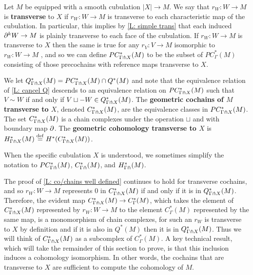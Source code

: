\begin{definition}
	Let $M$ be equipped with a smooth cubulation $|X| \to M$.
	We say that $r_W \colon W \to M$ is \textbf{transverse} to $X$ if $r_W \colon W \to M$ is transverse to each characteristic map of the cubulation.
	In particular, this implies by \cref{L: simple trans} that each induced $\partial^kW \to M$ is plainly transverse to each face of the cubulation.
	If $r_W \colon W \to M$ is transverse to $X$ then the same is true for any $r_V \colon V \to M$ isomorphic to $r_W \colon W \to M$ , and so we can define $PC^*_{\Gamma \pitchfork X}(M)$ to be the subset of $PC^*_{\Gamma}(M)$ consisting of those precochains with reference maps transverse to $X$.

	We let $Q^*_{\Gamma \pitchfork X}(M) = PC_{\Gamma \pitchfork X}^*(M) \cap Q^*(M)$ and note that the equivalence relation of \cref{L: cancel Q} descends to an equivalence relation on $PC_{\Gamma \pitchfork X}^*(M)$ such that $V\sim W$ if and only if $V \sqcup -W \in Q^*_{\Gamma \pitchfork X}(M)$.
	The \textbf{geometric cochains of $M$ transverse to $X$}, denoted $C_{\Gamma \pitchfork X}^*(M)$, are the equivalence classes in $PC_{\Gamma \pitchfork X}^*(M)$.
	The set $C_{\Gamma \pitchfork X}^*(M)$ is a chain complexes under the operation $\sqcup$ and with boundary map $\partial$.
	The \textbf{geometric cohomology transverse to $X$} is $H_{\Gamma \pitchfork X}^*(M) \stackrel{\mathrm{def}}{=} H^*(C_{\Gamma \pitchfork X}^*(M))$.

	When the specific cubulation $X$ is understood, we sometimes simplify the notation to $PC_{\Gamma\pitchfork}^*(M)$, $C_{\Gamma\pitchfork}^*(M)$, and $H_{\Gamma\pitchfork}^*(M)$.
\end{definition}

The proof of \cref{L: co/chains well defined} continues to hold for transverse cochains, and so $r_W \colon W \to M$ represents $0$ in $C^*_{\Gamma \pitchfork X}(M)$ if and only if it is in $Q^*_{\Gamma \pitchfork X}(M)$.
Therefore, the evident map $C^*_{\Gamma \pitchfork X}(M) \to C^*_\Gamma(M)$, which takes the element of $C^*_{\Gamma \pitchfork X}(M)$ represented by $r_W \colon W \to M$ to the element $C^*_\Gamma(M)$ represented by the same map, is a monomorphism of chain complexes, for such an $r_W$ is transverse to $X$ by definition and if it is also in $Q^*(M)$ then it is in $Q^*_{\Gamma \pitchfork X}(M)$.
Thus we will think of $C^*_{\Gamma \pitchfork X}(M)$ as a subcomplex of $C^*_\Gamma(M)$.
A key technical result, which will take the remainder of this section to prove,
is that this inclusion induces a cohomology isomorphism.
In other words, the cochains that are transverse to $X$ are sufficient to compute the cohomology of $M$.

